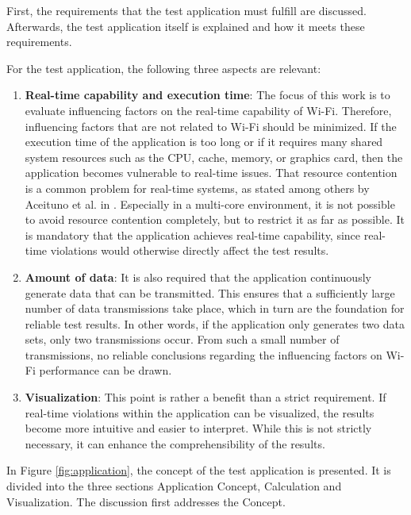 First, the requirements that the test application must fulfill are discussed.  
Afterwards, the test application itself is explained and how it meets these requirements.  

For the test application, the following three aspects are relevant:  

\begin{enumerate}
    \item \textbf{Real-time capability and execution time}:  
    The focus of this work is to evaluate influencing factors on the real-time capability of Wi-Fi.  
    Therefore, influencing factors that are not related to Wi-Fi should be minimized.  
    If the execution time of the application is too long or if it requires many shared system resources such as the \ac{CPU}, cache, memory, or graphics card, then the application becomes vulnerable to real-time issues.  
    That resource contention is a common problem for real-time systems, as stated among others by Aceituno et al. in \cite[p. 1]{ACEITUNO2021102223}.
    Especially in a multi-core environment, it is not possible to avoid resource contention completely, but to restrict it as far as possible.
    It is mandatory that the application achieves real-time capability, since real-time violations would otherwise directly affect the test results.  
    
    \item \textbf{Amount of data}:  
    It is also required that the application continuously generate data that can be transmitted.  
    This ensures that a sufficiently large number of data transmissions take place, which in turn are the foundation for reliable test results.  
    In other words, if the application only generates two data sets, only two transmissions occur.  
    From such a small number of transmissions, no reliable conclusions regarding the influencing factors on Wi-Fi performance can be drawn.  

    \item \textbf{Visualization}:  
    This point is rather a benefit than a strict requirement.  
    If real-time violations within the application can be visualized, the results become more intuitive and easier to interpret.  
    While this is not strictly necessary, it can enhance the comprehensibility of the results.  
\end{enumerate}

In Figure \ref{fig:application}, the concept of the test application is presented.  
It is divided into the three sections Application Concept, Calculation and Visualization.  
The discussion first addresses the Concept.  

